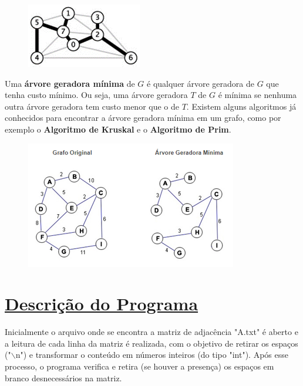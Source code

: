 \documentclass{article}
\begin{document}
\begin{figure}[H]
	\centering
	\includegraphics[width=0.5\linewidth]{"Figuras/IMG4"}
	\label{fig:img4}
	\caption{}
\end{figure}\vspace*{0.2cm}

	Uma \textbf{árvore geradora mínima} de $G$ é qualquer árvore geradora de $G$ que tenha custo mínimo. Ou seja, uma árvore geradora $T$ de $G$ é mínima se nenhuma outra árvore geradora tem custo menor que o de $T$. Existem alguns algoritmos já conhecidos para encontrar a árvore geradora mínima em um grafo, como por exemplo o \textbf{Algoritmo de Kruskal} e o \textbf{Algoritmo de Prim}. 
	
	\begin{figure}[H]
		\centering
		\includegraphics[width=0.7\linewidth]{"Figuras/IMG5"}
		\label{fig:img5}
		\caption{}
	\end{figure}\vspace*{0.4cm}
		
		\section{{\Large \underline{Descrição do Programa}}}\vspace*{0.3cm}
		
		Inicialmente o arquivo onde se encontra a matriz de adjacência "A.txt" é aberto e a leitura de cada linha da matriz é realizada, com o objetivo de retirar os espaços ("$\backslash$n") e transformar o conteúdo em números inteiros (do tipo "int"). Após esse processo, o programa verifica e retira (se houver a presença) os espaços em branco desnecessários na matriz.
		
\end{document}
